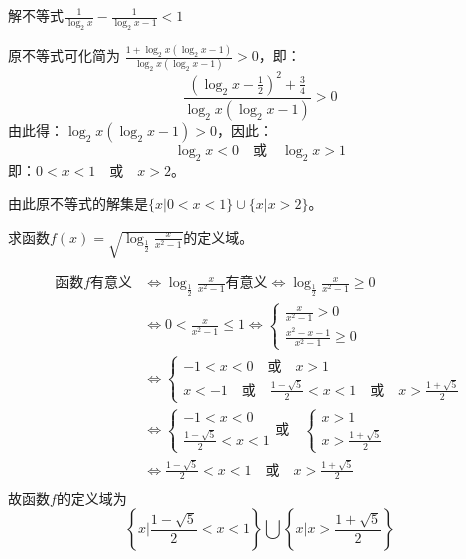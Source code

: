 \begin{example}
  解不等式$\frac{1}{\log_2 x}-\frac{1}{\log_2 x-1}<1$
\end{example}

\begin{solution}
  原不等式可化简为 $\frac{1+\log_2 x(\log_2 x-1)}{\log_2 x(\log_2 x-1)}>0$，即：
\[\frac{\left(\log_2 x-\frac{1}{2}\right)^2+\frac{3}{4}}{\log_2 x(\log_2 x-1)}>0\]
由此得：$\log_2 x(\log_2 x-1)>0$，因此：
\[\log_2 x<0\quad \text{或}\quad \log_2 x>1\]
即：$0<x<1\quad \text{或}\quad x>2$。

由此原不等式的解集是$\{x|0<x<1\}\cup\{x|x>2\}$。
\end{solution}

\begin{example}
  求函数$f(x)=\sqrt{\log_{\tfrac{1}{2}}\frac{x}{x^2-1}}$的定义域。
\end{example}

\begin{solution}
\[\begin{split}
  \text{函数$f$有意义}&\Longleftrightarrow \log_{\tfrac{1}{2}}\frac{x}{x^2-1}\text{有意义}\Longleftrightarrow \log_{\tfrac{1}{2}}\frac{x}{x^2-1}\ge 0\\
  &\Longleftrightarrow  0<   \frac{x}{x^2-1}\le 1    \Longleftrightarrow  \begin{cases}
    \frac{x}{x^2-1}>0\\ \frac{x^2-x-1}{x^2-1}\ge 0
  \end{cases}           \\
  &\Longleftrightarrow     \begin{cases}
    -1<x<0\quad \text{或}\quad x>1\\
    x<-1\quad \text{或}\quad \frac{1-\sqrt{5}}{2}<x<1\quad \text{或}\quad x>\frac{1+\sqrt{5}}{2}
  \end{cases}               \\
  &\Longleftrightarrow   \begin{cases}
    -1<x<0\\  \frac{1-\sqrt{5}}{2}<x<1
  \end{cases}      \text{或}\quad  \begin{cases}
    x>1\\x>\frac{1+\sqrt{5}}{2}
  \end{cases}           \\
  &\Longleftrightarrow    \frac{1-\sqrt{5}}{2}<x<1  \quad \text{或}\quad   x>\frac{1+\sqrt{5}}{2}   \\
\end{split}\]
故函数$f$的定义域为
\[\left\{x\Big| \frac{1-\sqrt{5}}{2}<x<1 \right\}\bigcup\left\{x\Big|x>\frac{1+\sqrt{5}}{2}  \right\}\]
\end{solution}


